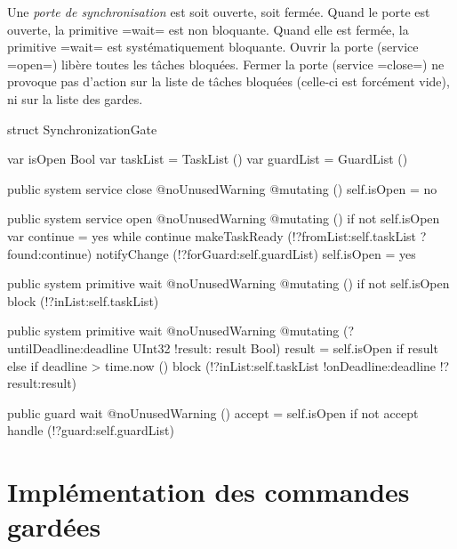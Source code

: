 
Une \emph{porte de synchronisation} est soit ouverte, soit fermée. Quand le porte est ouverte, la primitive \plm=wait= est non bloquante. Quand elle est fermée, la primitive \plm=wait= est systématiquement bloquante. Ouvrir la porte (service \plm=open=) libère toutes les tâches bloquées. Fermer la porte (service \plm=close=) ne provoque pas d'action sur la liste de tâches bloquées (celle-ci est forcément vide), ni sur la liste des gardes.

\begin{PLM}
struct SynchronizationGate {
  var isOpen Bool
  var taskList = TaskList ()
  var guardList = GuardList ()
  
  public system service close @noUnusedWarning @mutating () {
    self.isOpen = no
  }
  
  public system service open @noUnusedWarning @mutating () {
    if not self.isOpen {
      var continue = yes
      while continue {
        makeTaskReady (!?fromList:self.taskList ?found:continue)
      }
      notifyChange (!?forGuard:self.guardList)
      self.isOpen = yes
    }
  }
  
  public system primitive wait @noUnusedWarning @mutating () {
    if not self.isOpen {
      block (!?inList:self.taskList)
    }
  }
  
  public system primitive wait
  @noUnusedWarning @mutating (?untilDeadline:deadline UInt32
                              !result: result Bool) {
    result = self.isOpen
    if result {
    }else if deadline > time.now () {
      block (!?inList:self.taskList !onDeadline:deadline !?result:result)
    }
  }

  public guard wait @noUnusedWarning () {
    accept = self.isOpen
    if not accept {
      handle (!?guard:self.guardList)
    }
  }
}
\end{PLM}






\section{Implémentation des commandes gardées}

